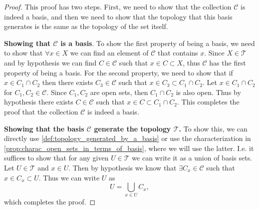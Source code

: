 \begin{proof}
	This proof has two steps. First, we need to show that the collection $ \mathcal{C} $ is indeed a basis, and then we need to show that the topology that this basis generates is the same as the topology of the set itself.
	
	\noindent \textbf{Showing that $ \mathcal{C} $ is a basis}. To show the first property of being a basis, we need to show that $ \forall x \in X $ we can find an element of $ \mathcal{C} $ that contains $ x $. Since $ X \in \mathcal{T} $ and by hypothesis we can find  $ C \in \mathcal{C} $ such that $ x \in C \subset X $, thus $ \mathcal{C} $ has the first property of being a basis. For the second property, we need to show that if $ x \in C_1 \cap C_2 $ then there exists $ C_3 \in \mathcal{C} $ such that $ x \in C_3 \subset C_1\cap C_2 $. Let $ x\in C_1\cap C_2 $ for $  C_1 , C_2 \in \mathcal{C} $. Since $ C_1,C_2 $ are open sets, then $ C_1\cap C_2 $ is also open. Thus by hypothesis there exists $ C \in \mathcal{C} $ such that $ x \in C \subset C_1\cap C_2 $. This completes the proof that the collection $ \mathcal{C} $ is indeed a basis.
	
	\noindent \textbf{Showing that the basis $ \mathcal{C} $ generate the topology $ \mathcal{T} $.} To show this, we can directly use \autoref{def:topology_generated_by_a_basis} or use the characterization in \autoref{prop:charac_open_sets_in_terms_of_basis}, where we will use the latter. I.e. it suffices to show that for any given $ U \in\mathcal{T} $ we can write it as a union of basis sets. Let $ U \in \mathcal{T} $ and $ x \in U $. Then by hypothesis we know that $ \exists C_x \in \mathcal{C} $ such that $ x \in C_x \subset U $. Thus we can write $ U $ as 
	\[ U = \bigcup_{x \in U} C_x, \]
	which completes the proof.
\end{proof}


